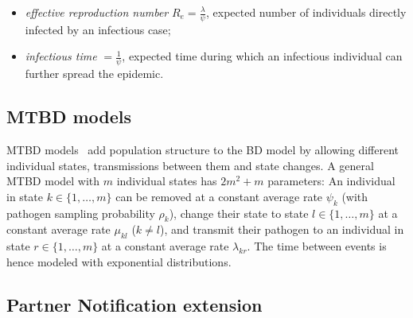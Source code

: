 \documentclass[a4paper,10pt]{article}
\begin{document}
\begin{itemize}
\item \textit{effective reproduction number} $R_e = \frac{\lambda}{\psi}$, expected number of individuals directly infected by an infectious case;
\item \textit{infectious time} $=\frac{1}{\psi}$, expected time during which an infectious individual can further spread the epidemic.
\end{itemize} 



\subsection{MTBD models}
MTBD models~\citep{Stadler2013a} add population structure to the BD model by allowing different individual states, transmissions between them and state changes. A general MTBD model with $m$ individual states has $2m^2 + m$ parameters: An individual in state $k \in \{1, \ldots, m\}$ can be removed at a constant average rate $\psi_k$ (with pathogen sampling probability $\rho_k$), change their state to state $l \in \{1, \ldots, m\}$ at a constant average rate $\mu_{kl}$ ($k \neq l$), and transmit their pathogen to an individual in state $r \in \{1, \ldots, m\} $ at a constant average rate $\lambda_{kr}$. The time between events %
is hence modeled with exponential distributions.


\subsection{Partner Notification extension}
\end{document}
